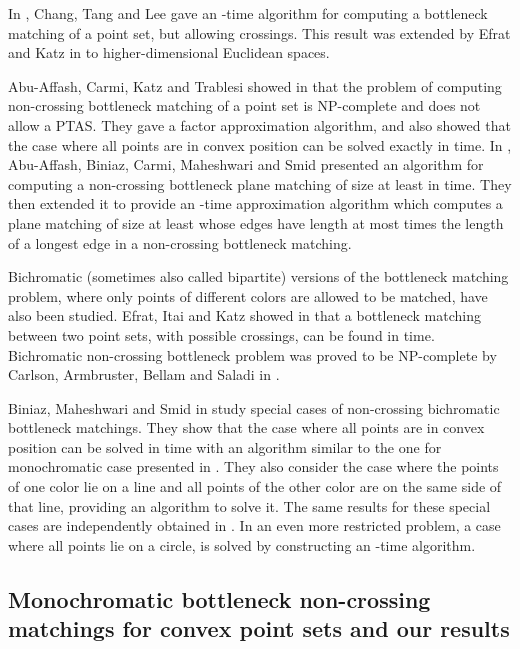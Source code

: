 \documentclass[a4paper, 11pt]{article}
\begin{document}
In \cite{chang1992solving}, Chang, Tang and Lee gave an -time algorithm for computing a bottleneck matching of a point set, but allowing crossings. This result was extended by Efrat and Katz in \cite{efrat2000computing} to higher-dimensional Euclidean spaces.

Abu-Affash, Carmi, Katz and Trablesi showed in \cite{abu2014bottleneck} that the problem of computing non-crossing bottleneck matching of a point set is NP-complete and does not allow a PTAS. They gave a  factor approximation algorithm, and also showed that the case where all points are in convex position can be solved exactly in  time. In \cite{abu2015approximating}, Abu-Affash, Biniaz, Carmi, Maheshwari and Smid presented an algorithm for computing a non-crossing bottleneck plane matching of size at least  in  time. They then extended it to provide an -time approximation algorithm which computes a plane matching of size at least  whose edges have length at most  times the length of a longest edge in a non-crossing bottleneck matching.


Bichromatic (sometimes also called bipartite) versions of the bottleneck matching problem, where only points of different colors are allowed to be matched, have also been studied. Efrat, Itai and Katz showed in \cite{efrat01geometryhelps} that a bottleneck matching between two point sets, with possible crossings, can be found in  time. Bichromatic non-crossing bottleneck problem was proved to be NP-complete by Carlson, Armbruster, Bellam and Saladi in \cite{carlsson2015bottleneck}.

Biniaz, Maheshwari and Smid in \cite{biniaz2014bottleneck} study special cases of non-crossing bichromatic bottleneck matchings. They show that the case where all points are in convex position can be solved in  time with an algorithm similar to the one for monochromatic case presented in \cite{abu2014bottleneck}. They also consider the case where the points of one color lie on a line and all points of the other color are on the same side of that line, providing an  algorithm to solve it. The same results for these special cases are independently obtained in \cite{carlsson2015bottleneck}. In \cite{biniaz2014bottleneck} an even more restricted problem, a case where all points lie on a circle, is solved by constructing an -time algorithm.



\subsection{Monochromatic bottleneck non-crossing matchings for convex point sets and our results}
\end{document}
